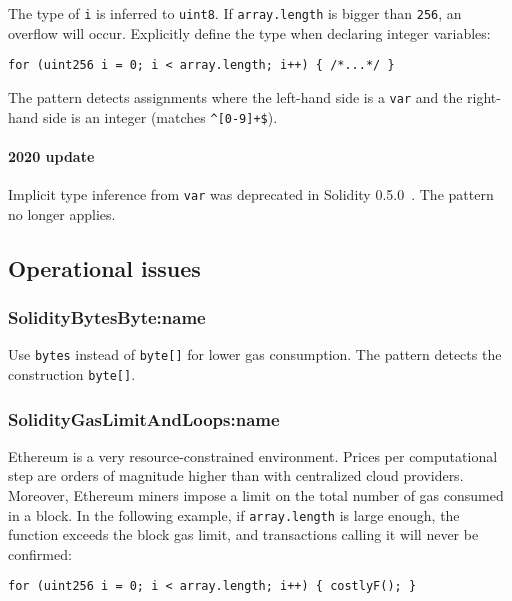 The type of \texttt{i} is inferred to \texttt{uint8}.
If \texttt{array.length} is bigger than \texttt{256}, an overflow will occur.
Explicitly define the type when declaring integer variables:

\begin{lstlisting}[language=Solidity]
for (uint256 i = 0; i < array.length; i++) { /*...*/ }
\end{lstlisting}

The pattern detects assignments where the left-hand side is a \texttt{var} and the right-hand side is an integer (matches \texttt{\^{}[0-9]+\$}).

\paragraph{2020 update}
Implicit type inference from \texttt{var} was deprecated in Solidity 0.5.0~\cite{Solidity050}.
The pattern no longer applies.

\subsection{Operational issues} \label{sec:OperationalIssues}

\subsubsection{\usevalue SolidityBytesByte:name } \label{SolidityBytesByte}

Use \texttt{bytes} instead of \texttt{byte[]} for lower gas consumption.
The pattern detects the construction \texttt{byte[]}.

\subsubsection{\usevalue SolidityGasLimitAndLoops:name } \label{SolidityGasLimitAndLoops}

Ethereum is a very resource-constrained environment.
Prices per computational step are orders of magnitude higher than with centralized cloud providers.
Moreover, Ethereum miners impose a limit on the total number of gas consumed in a block.
In the following example, if \texttt{array.length} is large enough, the function exceeds the block gas limit, and transactions calling it will never be confirmed:

\begin{lstlisting}[language=Solidity]
for (uint256 i = 0; i < array.length; i++) { costlyF(); }
\end{lstlisting}

